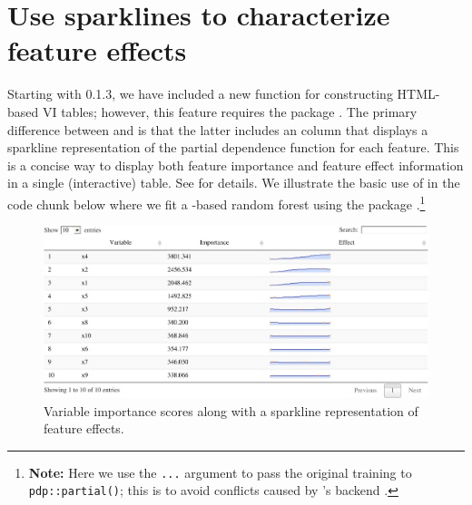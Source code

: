 \section{Use sparklines to characterize feature effects}

Starting with  0.1.3, we have included a new function
 for constructing HTML-based VI tables; however,
this feature requires the  package \citep{R-DT}. The primary
difference between  and  is that the
latter includes an  column that displays a sparkline
representation of the partial dependence function for each feature. This
is a concise way to display both feature importance and feature effect
information in a single (interactive) table. See
 for details. We illustrate the basic use of
 in the code chunk below where we fit a
-based random forest using the  package
\citep{R-mlr3}.\footnote{\textbf{Note:} Here we use the \texttt{...}
  argument to pass the original training to \texttt{pdp::partial()};
  this is to avoid conflicts caused by 's 
  backend \citep{R-data.table}.}

\begin{Schunk}
\begin{figure}[!htb]

{\centering \includegraphics[width=1\linewidth]{greenwell-boehmke_files/figure-latex/sparklines-1}

}

\caption[Variable importance scores along with a sparkline representation of feature effects]{Variable importance scores along with a sparkline representation of feature effects.}\label{fig:sparklines}
\end{figure}
\end{Schunk}

